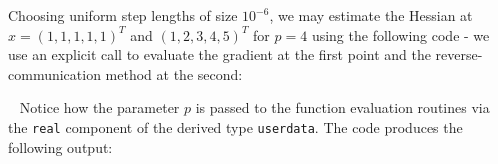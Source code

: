 \documentclass{galahad}
\begin{document}
Choosing uniform  step lengths of size $10^{-6}$, we may estimate the
Hessian at $x = (1,1,1,1,1)^T$ and $(1,2,3,4,5)^T$ for $p = 4$ using the
following code - we use an explicit call to evaluate the gradient 
at the first point and the reverse-communication method at the second:

{\tt \small
\VerbatimInput{\packageexample}
}
\noindent
Notice how the parameter $p$ is passed to the function evaluation 
routines via the {\tt real} component of the derived type {\tt userdata}.
The code produces the following output:
{\tt \small
\VerbatimInput{\packageresults}
}
\noindent
\end{document}
